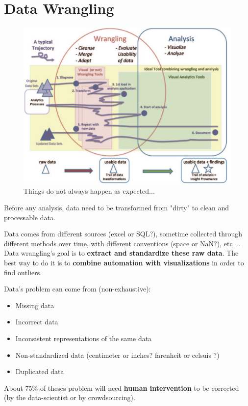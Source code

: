\documentclass[a4paper,11pt,twoside]{article}
\begin{document}
\section{Data Wrangling}

\begin{figure}[H]%
 \centering
 \includegraphics[width=12cm]{./pic/path_data_wrangling}
 \caption{\label{path_data_wrangling}Things do not always happen as expected...}
\end{figure}

Before any analysis, data need to be transformed from "dirty" to clean and processable data. 

Data comes from different sources (excel or SQL?), sometime collected through different methods over time, with different conventions (space or NaN?), etc ... Data wrangling's goal is to \textbf{extract and standardize these raw data}. The best way to do it is to \textbf{combine automation with visualizations} in order to find outliers. 

Data's problem can come from (non-exhaustive): 
\begin{itemize}
  \item Missing data
  \item Incorrect data
  \item Inconsistent representations of the same data
  \item Non-standardized data (centimeter or inches? farenheit or celsuis ?)
  \item Duplicated data
\end{itemize}

About 75\% of theses problem will need \textbf{human intervention} to be corrected (by the data-scientist or by crowdsourcing).
\end{document}
